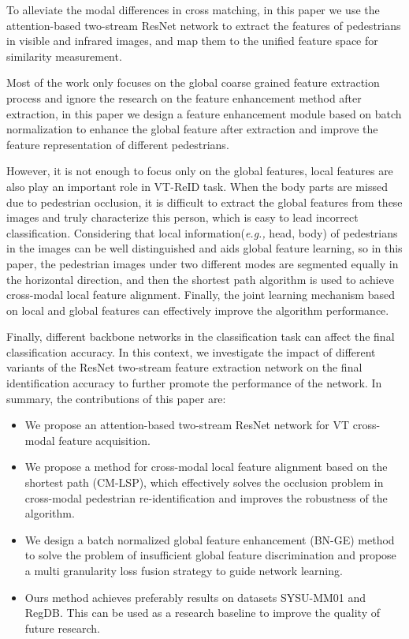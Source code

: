 \documentclass[journal]{IEEEtran}
\begin{document}
	To alleviate the modal differences in cross matching, in this paper we use the attention-based two-stream ResNet network to extract the features of pedestrians in visible and infrared images, and map them to the unified feature space for similarity measurement. 
	
	Most of the work only focuses on the global coarse grained feature extraction process and ignore the research on the feature enhancement method after extraction, in this paper we design a feature enhancement module based on batch normalization to enhance the global feature after extraction and improve the feature representation of different pedestrians.
	
	However, it is not enough to focus only on the global features, local features are also play an important role in VT-ReID task. When the body parts are missed due to pedestrian occlusion, it is difficult to extract the global features from these images and truly characterize this person, which is easy to lead incorrect classification. Considering that local information(\textit{e.g.,} head, body)  of pedestrians in the images can be well distinguished and aids global feature learning, so in this paper, the pedestrian images under two different modes are segmented equally in the horizontal direction, and then the shortest path algorithm is used to achieve cross-modal local feature alignment. Finally, the joint learning mechanism based on local and global features can effectively improve the algorithm performance.
	
	Finally, different backbone networks in the classification task can affect the final classification accuracy. In this context, we investigate the impact of different variants of the ResNet two-stream feature extraction network on the final identification accuracy to further promote the performance of the network. 
	In summary, the contributions of this paper are:
	
	\begin{itemize}
\item We propose an attention-based two-stream ResNet network for VT cross-modal feature acquisition.
		\item We propose a method for cross-modal local feature alignment based on the shortest path (CM-LSP), which effectively solves the occlusion problem in cross-modal pedestrian re-identification and improves the robustness of the algorithm.
		\item We design a batch normalized global feature enhancement (BN-GE) method to solve the problem of insufficient global feature discrimination and propose a multi granularity loss fusion strategy to guide network learning.
		\item Ours method achieves preferably results on datasets SYSU-MM01 and RegDB. This can be used as a research baseline to improve the quality of future research.
		
	\end{itemize}
\end{document}

